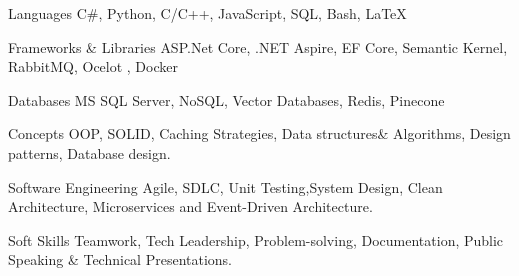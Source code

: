 

\begin{cvskills}

  \cvskill
    {Languages} %
    {C\#, Python, C/C++, JavaScript, SQL, Bash, LaTeX}

  \cvskill
    {Frameworks \& Libraries} %
    {ASP.Net Core, .NET Aspire, EF Core, Semantic Kernel, RabbitMQ, Ocelot , Docker}

  \cvskill
    {Databases} %
    {MS SQL Server, NoSQL, Vector Databases, Redis, Pinecone}

\cvskill
    {Concepts} %
    {OOP, SOLID, Caching Strategies, Data structures\& Algorithms, Design patterns, Database design. }

\cvskill
    {Software Engineering} %
    {Agile, SDLC, Unit Testing,System Design, Clean Architecture, Microservices and Event-Driven Architecture. }

  \cvskill
    {Soft Skills} %
    {Teamwork, Tech Leadership, Problem-solving, Documentation, Public Speaking \& Technical Presentations.} %

\end{cvskills}
 